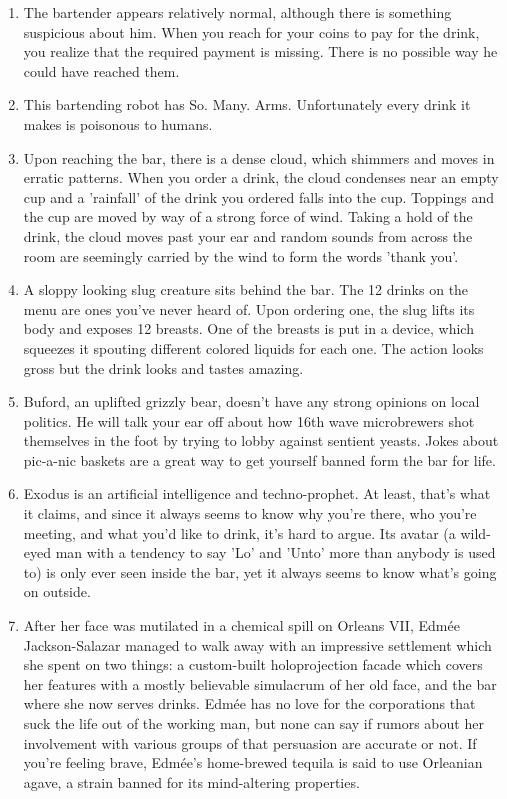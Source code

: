 \documentclass{article}
\begin{document}
\begin{enumerate}
	\item The bartender appears relatively normal, although there is something suspicious about him. When you reach for your coins to pay for the drink, you realize that the required payment is missing. There is no possible way he could have reached them.
	\item This bartending robot has So. Many. Arms. Unfortunately every drink it makes is poisonous to humans.
	\item Upon reaching the bar, there is a dense cloud, which shimmers and moves in erratic patterns. When you order a drink, the cloud condenses near an empty cup and a 'rainfall' of the drink you ordered falls into the cup. Toppings and the cup are moved by way of a strong force of wind. Taking a hold of the drink, the cloud moves past your ear and random sounds from across the room are seemingly carried by the wind to form the words 'thank you'.
	\item A sloppy looking slug creature sits behind the bar. The 12 drinks on the menu are ones you've never heard of. Upon ordering one, the slug lifts its body and exposes 12 breasts. One of the breasts is put in a device, which squeezes it spouting different colored liquids for each one. The action looks gross but the drink looks and tastes amazing.
	\item Buford, an uplifted grizzly bear, doesn't have any strong opinions on local politics. He will talk your ear off about how 16th wave microbrewers shot themselves in the foot by trying to lobby against sentient yeasts. Jokes about pic-a-nic baskets are a great way to get yourself banned form the bar for life.
	\item Exodus is an artificial intelligence and techno-prophet. At least, that's what it claims, and since it always seems to know why you're there, who you're meeting, and what you'd like to drink, it's hard to argue. Its avatar (a wild-eyed man with a tendency to say 'Lo' and 'Unto' more than anybody is used to) is only ever seen inside the bar, yet it always seems to know what's going on outside.
	\item After her face was mutilated in a chemical spill on Orleans VII, Edmée Jackson-Salazar managed to walk away with an impressive settlement which she spent on two things: a custom-built holoprojection facade which covers her features with a mostly believable simulacrum of her old face, and the bar where she now serves drinks. Edmée has no love for the corporations that suck the life out of the working man, but none can say if rumors about her involvement with various groups of that persuasion are accurate or not. If you're feeling brave, Edmée's home-brewed tequila is said to use Orleanian agave, a strain banned for its mind-altering properties.

\end{enumerate}
\end{document}
